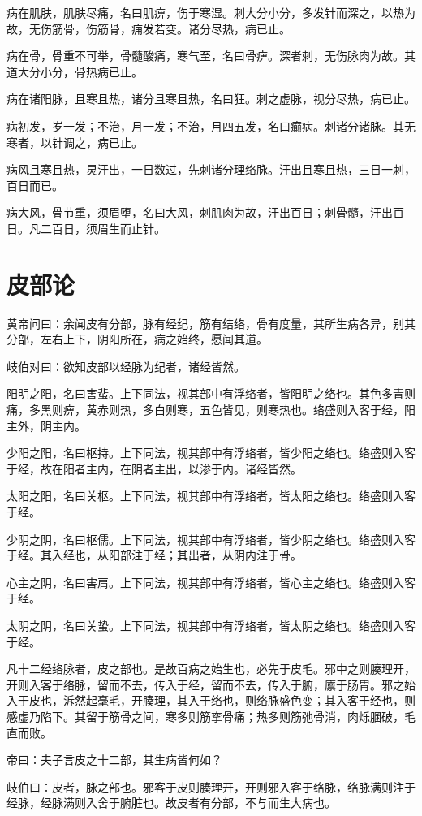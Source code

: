 \documentclass{article}%
\begin{document}
病在肌肤，肌肤尽痛，名曰肌痹，伤于寒湿。刺大分小分，多发针而深之，以热为故，无伤筋骨，伤筋骨，痈发若变。诸分尽热，病已止。

病在骨，骨重不可举，骨髓酸痛，寒气至，名曰骨痹。深者刺，无伤脉肉为故。其道大分小分，骨热病已止。

病在诸阳脉，且寒且热，诸分且寒且热，名曰狂。刺之虚脉，视分尽热，病已止。

病初发，岁一发；不治，月一发；不治，月四五发，名曰癫病。刺诸分诸脉。其无寒者，以针调之，病已止。

病风且寒且热，炅汗出，一日数过，先刺诸分理络脉。汗出且寒且热，三日一刺，百日而已。

病大风，骨节重，须眉堕，名曰大风，刺肌肉为故，汗出百日；刺骨髓，汗出百日。凡二百日，须眉生而止针。
\section{皮部论}
黄帝问曰：余闻皮有分部，脉有经纪，筋有结络，骨有度量，其所生病各异，别其分部，左右上下，阴阳所在，病之始终，愿闻其道。

岐伯对曰：欲知皮部以经脉为纪者，诸经皆然。

阳明之阳，名曰害蜚。上下同法，视其部中有浮络者，皆阳明之络也。其色多青则痛，多黑则痹，黄赤则热，多白则寒，五色皆见，则寒热也。络盛则入客于经，阳主外，阴主内。

少阳之阳，名曰枢持。上下同法，视其部中有浮络者，皆少阳之络也。络盛则入客于经，故在阳者主内，在阴者主出，以渗于内。诸经皆然。

太阳之阳，名曰关枢。上下同法，视其部中有浮络者，皆太阳之络也。络盛则入客于经。

少阴之阴，名曰枢儒。上下同法，视其部中有浮络者，皆少阴之络也。络盛则入客于经。其入经也，从阳部注于经；其出者，从阴内注于骨。

心主之阴，名曰害肩。上下同法，视其部中有浮络者，皆心主之络也。络盛则入客于经。

太阴之阴，名曰关蛰。上下同法，视其部中有浮络者，皆太阴之络也。络盛则入客于经。

凡十二经络脉者，皮之部也。是故百病之始生也，必先于皮毛。邪中之则腠理开，开则入客于络脉，留而不去，传入于经，留而不去，传入于腑，廪于肠胃。邪之始入于皮也，泝然起毫毛，开腠理，其入于络也，则络脉盛色变；其入客于经也，则感虚乃陷下。其留于筋骨之间，寒多则筋挛骨痛；热多则筋弛骨消，肉烁䐃破，毛直而败。

帝曰：夫子言皮之十二部，其生病皆何如？

岐伯曰：皮者，脉之部也。邪客于皮则腠理开，开则邪入客于络脉，络脉满则注于经脉，经脉满则入舍于腑脏也。故皮者有分部，不与而生大病也。
\end{document}
